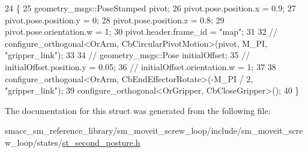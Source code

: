 \begin{DoxyCode}
24         \{
25             geometry\_msgs::PoseStamped pivot;
26             pivot.pose.position.x = 0.9;
27             pivot.pose.position.y = 0;
28             pivot.pose.position.z = 0.8;
29             pivot.pose.orientation.w = 1;
30             pivot.header.frame\_id = \textcolor{stringliteral}{"map"};
31 
32             \textcolor{comment}{// configure\_orthogonal<OrArm, CbCircularPivotMotion>(pivot, M\_PI, "gripper\_link");}
33 
34             \textcolor{comment}{// geometry\_msgs::Pose initialOffset;}
35             \textcolor{comment}{// initialOffset.position.y = 0.05;}
36             \textcolor{comment}{// initialOffset.orientation.w = 1;}
37 
38             configure\_orthogonal<OrArm, CbEndEffectorRotate>(-M\_PI / 2, \textcolor{stringliteral}{"gripper\_link"});
39             configure\_orthogonal<OrGripper, CbCloseGripper>();
40         \}
\end{DoxyCode}


The documentation for this struct was generated from the following file\+:\begin{DoxyCompactItemize}
\item 
smacc\+\_\+sm\+\_\+reference\+\_\+library/sm\+\_\+moveit\+\_\+screw\+\_\+loop/include/sm\+\_\+moveit\+\_\+screw\+\_\+loop/states/\hyperlink{st__second__posture_8h}{st\+\_\+second\+\_\+posture.\+h}\end{DoxyCompactItemize}

